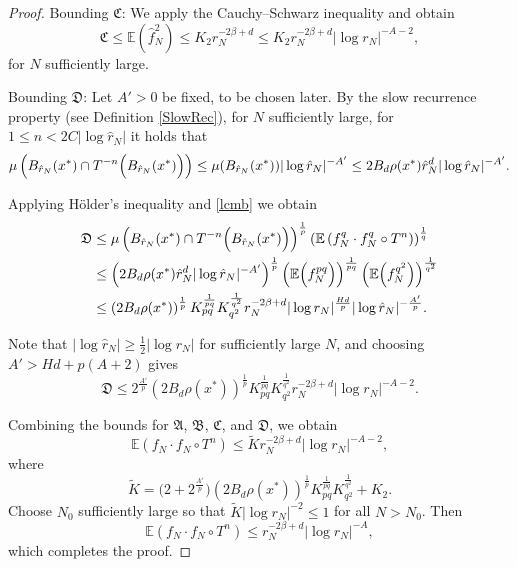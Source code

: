 \documentclass[11pt,twoside,a4paper,reqno]{amsart}
\newcommand{\E}{\mathbb{E}}
\begin{document}
\begin{proof}
Bounding $\mathfrak{C}$: We apply the Cauchy--Schwarz inequality and obtain
\begin{equation*}
\mathfrak{C} \le \E (\hat{f}_N^2)\le K_2\hat{r}_N^{-2\beta+d}\le K_2 r_N^{-2\beta+d}|\log r_N|^{-A-2},
\end{equation*}
for $N$ sufficiently large.


Bounding $\mathfrak{D}$: Let $A'>0$ be fixed, to be chosen later. By the slow recurrence property (see Definition \ref{SlowRec}), for $N$ sufficiently large, for $1\le n<2C|\log\hat{r}_N|$ it holds that
$$
\mu\left(B_{\hat{r}_N}(x^*) \cap T^{-n}\Bigl(B_{\hat{r}_N}(x^*)\Bigr)\right) \leq \mu(B_{\hat{r}_N}(x^*)) | \log \hat{r}_N |^{-A'} \leq 2B_d\rho(x^*)\hat{r}_N^d | \log \hat{r}_N|^{-A'}.
$$

Applying H\"{o}lder's inequality and \eqref{lcmb} we obtain
\begin{align*}
\mathfrak{D} &\leq\mu\left(B_{\hat{r}_N}(x^*)\cap T^{-n}\Bigl(B_{\hat{r}_N}(x^*)\Bigr)\right)^{\frac{1}{p}} \left(\E \left(f_N^q \cdot f_N^{q} \circ T^n \right)\right)^{\frac{1}{q}}\\
&\le\left(2B_d\rho(x^*)\hat{r}_N^d | \log \hat{r}_N|^{-A'}\right)^{\frac1p}\left(\E\Bigl(f_N^{pq}\Bigr) \right)^{\frac{1}{pq}} \left(\E \Bigl(f_N^{q^2}\Bigr) \right)^{\frac{1}{q^2}}\\
&\le\left(2B_d\rho(x^*)\right)^{\frac{1}{p}}K_{pq}^{\frac{1}{pq}}
K_{q^2}^{\frac{1}{q^2}}r_N^{-2\beta+d}|\log r_N|^{\frac{Hd}{p}}|\log\hat{r}_N|^{-\frac{A'}{p}}.
\end{align*}

Note that $|\log \hat{r}_N|\ge \frac{1}{2} |\log r_N|$ for sufficiently large $N$, and choosing $A'>Hd+p(A+2)$ gives
$$\mathfrak{D}\leq 2^{\frac{A'}{p}}\left(2B_d\rho(x^*)\right)^{\frac{1}{p}}K_{pq}^{\frac{1}{pq}}
K_{q^2}^{\frac{1}{q^2}}r_N^{-2\beta+d}|\log r_N|^{-A-2}.$$

Combining the bounds for $\mathfrak{A}$, $\mathfrak{B}$, $\mathfrak{C}$, and $\mathfrak{D}$, we obtain
$$\E\left(f_N \cdot f_N\circ T^n\right)\le\tilde{K}r_N^{-2\beta+d}|\log r_N|^{-A-2},
$$
where
$$\tilde{K}=\bigl(2+2^{\frac{A'}{p}}\bigr)\left(2B_d\rho(x^*)\right)^{\frac{1}{p}}K_{pq}^{\frac{1}{pq}}
K_{q^2}^{\frac{1}{q^2}}+K_2.
$$
Choose $N_0$ sufficiently large so that $\tilde{K}|\log r_N|^{-2}\le 1$ for all $N>N_0$. Then
$$\E\left(f_N \cdot f_N\circ T^n\right)\le r_N^{-2\beta+d}|\log r_N|^{-A},
$$
which completes the proof.
\end{proof}
\end{document}
